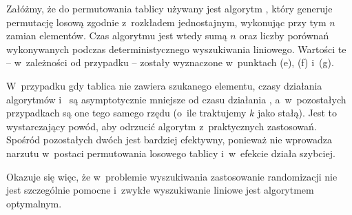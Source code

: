 \subproblem %
Załóżmy, że do permutowania tablicy używany jest algorytm , który generuje permutację losową zgodnie z~rozkładem jednostajnym, wykonując przy tym $n$ zamian elementów.
Czas algorytmu  jest wtedy sumą $n$ oraz liczby porównań wykonywanych podczas deterministycznego wyszukiwania liniowego.
Wartości te -- w~zależności od przypadku -- zostały wyznaczone w~punktach (e), (f) i~(g).

\subproblem %
W~przypadku gdy tablica nie zawiera szukanego elementu, czasy działania algorytmów  i~ są asymptotycznie mniejsze od czasu działania , a~w~pozostałych przypadkach są one tego samego rzędu (o~ile traktujemy $k$ jako stałą).
Jest to wystarczający powód, aby odrzucić algorytm  z~praktycznych zastosowań.
Spośród pozostałych dwóch  jest bardziej efektywny, ponieważ nie wprowadza narzutu w~postaci permutowania losowego tablicy i~w~efekcie działa szybciej.

Okazuje się więc, że w~problemie wyszukiwania zastosowanie randomizacji nie jest szczególnie pomocne i~zwykłe wyszukiwanie liniowe jest algorytmem optymalnym.
